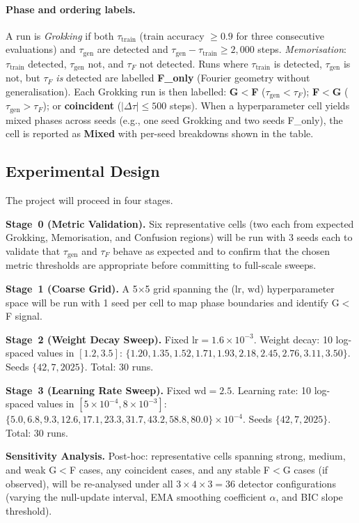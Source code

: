 \documentclass[12pt,openany,a4paper]{book}
\newcommand{\taug}{\tau_{\mathrm{gen}}}
\newcommand{\tauf}{\tau_{F}}
\newcommand{\Dtau}{\Delta\tau}
\begin{document}
\paragraph{Phase and ordering labels.}
A run is \textit{Grokking} if both $\tau_{\mathrm{train}}$
(train accuracy $\geq0.9$ for three consecutive evaluations)
and $\taug$ are detected and $\taug - \tau_{\mathrm{train}}
\geq 2{,}000$ steps.
\textit{Memorisation}: $\tau_{\mathrm{train}}$ detected, $\taug$ not,
and $\tauf$ not detected.
Runs where $\tau_{\mathrm{train}}$ is detected, $\taug$ is not, but
$\tauf$ \emph{is} detected are labelled \textbf{F\_only} (Fourier
geometry without generalisation).
Each Grokking run is then labelled:
\textbf{G$<$F} ($\taug < \tauf$);
\textbf{F$<$G} ($\taug > \tauf$);
or \textbf{coincident} ($|\Dtau| \leq 500$ steps).
When a hyperparameter cell yields mixed phases across seeds (e.g.,
one seed Grokking and two seeds F\_only), the cell is reported as
\textbf{Mixed} with per-seed breakdowns shown in the table.

\subsection{Experimental Design}

The project will proceed in four stages.

\textbf{Stage~0 (Metric Validation).}
Six representative cells (two each from expected Grokking,
Memorisation, and Confusion regions) will be run with 3 seeds each
to validate that $\taug$ and $\tauf$ behave as expected and to
confirm that the chosen metric thresholds are appropriate before
committing to full-scale sweeps.

\textbf{Stage~1 (Coarse Grid).}
A 5$\times$5 grid spanning the ($\mathrm{lr}$, $\mathrm{wd}$)
hyperparameter space will be run with 1 seed per cell to map phase
boundaries and identify G$<$F signal.

\textbf{Stage~2 (Weight Decay Sweep).}
Fixed $\mathrm{lr} = 1.6\times10^{-3}$.
Weight decay: 10 log-spaced values in $[1.2, 3.5]$:
$\{1.20, 1.35, 1.52, 1.71, 1.93, 2.18, 2.45, 2.76, 3.11, 3.50\}$.
Seeds $\{42, 7, 2025\}$. Total: 30 runs.

\textbf{Stage~3 (Learning Rate Sweep).}
Fixed $\mathrm{wd} = 2.5$.
Learning rate: 10 log-spaced values in $[5\times10^{-4}, 8\times10^{-3}]$:
$\{5.0, 6.8, 9.3, 12.6, 17.1, 23.3, 31.7, 43.2, 58.8, 80.0\}
\times 10^{-4}$.
Seeds $\{42, 7, 2025\}$. Total: 30 runs.

\textbf{Sensitivity Analysis.}
Post-hoc: representative cells spanning strong, medium, and weak
G$<$F cases, any coincident cases, and any stable F$<$G cases
(if observed), will be re-analysed under all $3\times4\times3 = 36$
detector configurations (varying the null-update interval, EMA
smoothing coefficient $\alpha$, and BIC slope threshold).
\end{document}
